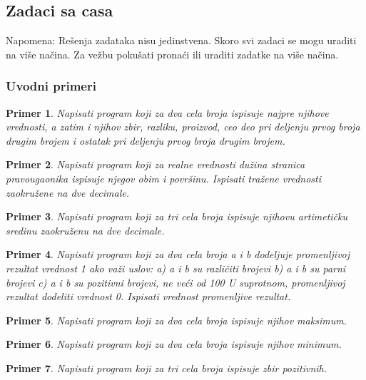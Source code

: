 \documentclass[a4paper]{article}
\newtheorem{primer}{Primer}[section]
\begin{document}
\newpage
\subsection{Zadaci sa casa}
Napomena: Rešenja zadataka nisu jedinstvena. Skoro svi zadaci se mogu uraditi na više načina. Za vežbu pokušati pronaći ili uraditi zadatke na više načina. 
\subsubsection{Uvodni primeri}

\begin{primer}
Napisati program koji za dva cela broja ispisuje najpre
njihove vrednosti, a zatim i njihov zbir, razliku, proizvod, ceo deo pri deljenju
prvog broja drugim brojem i ostatak pri deljenju prvog broja drugim brojem. 
\end{primer}


\begin{primer}
Napisati program koji za realne vrednosti dužina
stranica pravougaonika ispisuje njegov obim i površinu. Ispisati tražene vrednosti
zaokružene na dve decimale. 
\end{primer}

\begin{primer}
Napisati program koji za tri cela broja ispisuje
njihovu artimetičku sredinu zaokruženu na dve decimale.
\end{primer}

\begin{primer}
Napisati program koji za dva cela broja a i b dodeljuje
promenljivoj rezultat vrednost 1 ako važi uslov:
a) a i b su različiti brojevi
b) a i b su parni brojevi
c) a i b su pozitivni brojevi, ne veći od 100
U suprotnom, promenljivoj rezultat dodeliti vrednost 0. Ispisati vrednost promenljive
rezultat.
\end{primer}

\begin{primer}
Napisati program koji za dva cela broja ispisuje
njihov maksimum.
\end{primer}

\begin{primer}
Napisati program koji za dva cela broja ispisuje
njihov minimum.
\end{primer}

\begin{primer}
Napisati program koji za tri cela broja ispisuje zbir
pozitivnih.
\end{primer}
\end{document}
